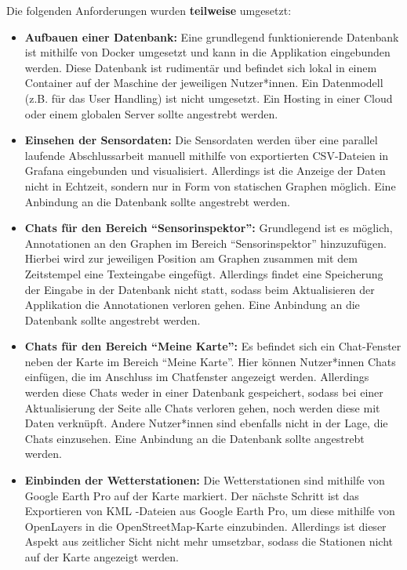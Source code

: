 Die folgenden Anforderungen wurden \textbf{teilweise} umgesetzt:

\begin{itemize}
    \item \textbf{Aufbauen einer Datenbank:} Eine grundlegend funktionierende Datenbank ist mithilfe von Docker umgesetzt und kann in die Applikation eingebunden werden. Diese Datenbank ist rudimentär und befindet sich lokal in einem Container auf der Maschine der jeweiligen Nutzer*innen. Ein Datenmodell (z.B. für das User Handling) ist nicht umgesetzt. Ein Hosting in einer Cloud oder einem globalen Server sollte angestrebt werden.
    \item \textbf{Einsehen der Sensordaten:} Die Sensordaten werden über eine parallel laufende Abschlussarbeit manuell mithilfe von exportierten CSV-Dateien in Grafana eingebunden und visualisiert. Allerdings ist die Anzeige der Daten nicht in Echtzeit, sondern nur in Form von statischen Graphen möglich. Eine Anbindung an die Datenbank sollte angestrebt werden.
    \item \textbf{Chats für den Bereich \enquote{Sensorinspektor}:} Grundlegend ist es möglich, Annotationen an den Graphen im Bereich \enquote{Sensorinspektor} hinzuzufügen. Hierbei wird zur jeweiligen Position am Graphen zusammen mit dem Zeitstempel eine Texteingabe eingefügt. Allerdings findet eine Speicherung der Eingabe in der Datenbank nicht statt, sodass beim Aktualisieren der Applikation die Annotationen verloren gehen. Eine Anbindung an die Datenbank sollte angestrebt werden.
    \item \textbf{Chats für den Bereich \enquote{Meine Karte}:} Es befindet sich ein Chat-Fenster neben der Karte im Bereich \enquote{Meine Karte}. Hier können Nutzer*innen Chats einfügen, die im Anschluss im Chatfenster angezeigt werden. Allerdings werden diese Chats weder in einer Datenbank gespeichert, sodass bei einer Aktualisierung der Seite alle Chats verloren gehen, noch werden diese mit Daten verknüpft. Andere Nutzer*innen sind ebenfalls nicht in der Lage, die Chats einzusehen. Eine Anbindung an die Datenbank sollte angestrebt werden.
    \item \textbf{Einbinden der Wetterstationen:} Die Wetterstationen sind mithilfe von Google Earth Pro auf der Karte markiert. Der nächste Schritt ist das Exportieren von KML -Dateien aus Google Earth Pro, um diese mithilfe von OpenLayers in die OpenStreetMap-Karte einzubinden. Allerdings ist dieser Aspekt aus zeitlicher Sicht nicht mehr umsetzbar, sodass die Stationen nicht auf der Karte angezeigt werden.

\end{itemize}

